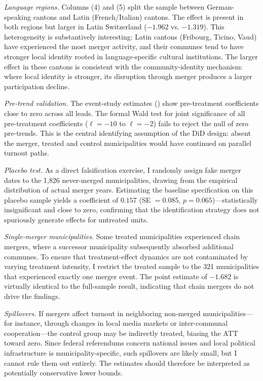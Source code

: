 \documentclass[12pt]{article}
\begin{document}
\textit{Language regions.} Columns (4) and (5) split the sample between German-speaking cantons and Latin (French/Italian) cantons. The effect is present in both regions but larger in Latin Switzerland ($-1.962$ vs. $-1.319$). This heterogeneity is substantively interesting: Latin cantons (Fribourg, Ticino, Vaud) have experienced the most merger activity, and their communes tend to have stronger local identity rooted in language-specific cultural institutions. The larger effect in these cantons is consistent with the community-identity mechanism: where local identity is stronger, its disruption through merger produces a larger participation decline.

\textit{Pre-trend validation.} The event-study estimates () show pre-treatment coefficients close to zero across all leads. The formal Wald test for joint significance of all pre-treatment coefficients ($\ell = -10$ to $\ell = -2$) fails to reject the null of zero pre-trends. This is the central identifying assumption of the DiD design: absent the merger, treated and control municipalities would have continued on parallel turnout paths.

\textit{Placebo test.} As a direct falsification exercise, I randomly assign fake merger dates to the 1,826 never-merged municipalities, drawing from the empirical distribution of actual merger years. Estimating the baseline specification on this placebo sample yields a coefficient of $0.157$ (SE $= 0.085$, $p = 0.065$)---statistically insignificant and close to zero, confirming that the identification strategy does not spuriously generate effects for untreated units.

\textit{Single-merger municipalities.} Some treated municipalities experienced chain mergers, where a successor municipality subsequently absorbed additional communes. To ensure that treatment-effect dynamics are not contaminated by varying treatment intensity, I restrict the treated sample to the 321 municipalities that experienced exactly one merger event. The point estimate of $-1.682$ is virtually identical to the full-sample result, indicating that chain mergers do not drive the findings.

\textit{Spillovers.} If mergers affect turnout in neighboring non-merged municipalities---for instance, through changes in local media markets or inter-communal cooperation---the control group may be indirectly treated, biasing the ATT toward zero. Since federal referendums concern national issues and local political infrastructure is municipality-specific, such spillovers are likely small, but I cannot rule them out entirely. The estimates should therefore be interpreted as potentially conservative lower bounds.
\end{document}
